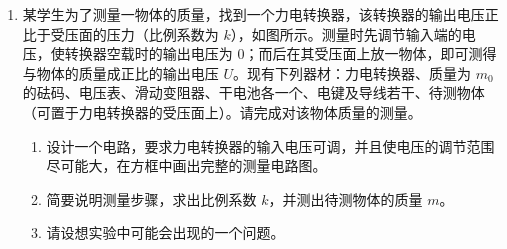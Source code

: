 \documentclass[\gkver]{gaokaozhenti}
\begin{document}
\begin{enumerate}
{\onepicture[align=center, h=7.34cm]{}

（2）由 $v-t$ 图可见 AD 段卷帘窗做匀加速运动，由公式 $\bar{v}_{DE}-\bar{v}_{AB}=a\cdot3\Delta t$，或逐差法 $a=\frac{(DE+CD)-(AB+BC)}{(2\Delta t)^{2}}$ 均可求得 $a=5\Umsq$。AK 段的平均速度 $v_{AK}=\frac{AK}{10\Delta t}=\frac{139\times10^{-2}}{10\times0.1}\Ums=1.39\Ums$。
}

\item
某学生为了测量一物体的质量，找到一个力电转换器，该转换器的输出电压正比于受压面的压力（比例系数为 $k$），如图所示。测量时先调节输入端的电压，使转换器空载时的输出电压为 0；而后在其受压面上放一物体，即可测得与物体的质量成正比的输出电压 $U$。现有下列器材：力电转换器、质量为 $m_{0}$ 的砝码、电压表、滑动变阻器、干电池各一个、电键及导线若干、待测物体（可置于力电转换器的受压面上）。请完成对该物体质量的测量。
\begin{enumerate}
	\item
	设计一个电路，要求力电转换器的输入电压可调，并且使电压的调节范围尽可能大，在方框中画出完整的测量电路图。
	\item
	简要说明测量步骤，求出比例系数 $k$，并测出待测物体的质量 $m$。
	\item
	请设想实验中可能会出现的一个问题。
\end{enumerate}

\onepicture[align=right, w=5.84cm]{}

\end{enumerate}
\end{document}
